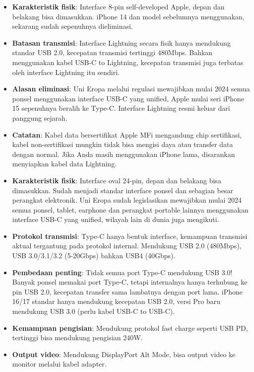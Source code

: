 
\begin{itemize}
  \item \textbf{Karakteristik fisik}: Interface 8-pin self-developed Apple, depan dan belakang bisa dimasukkan. iPhone 14 dan model sebelumnya menggunakan, sekarang sudah sepenuhnya dieliminasi.
  \item \textbf{Batasan transmisi}: Interface Lightning secara fisik hanya mendukung standar USB 2.0, kecepatan transmisi tertinggi 480Mbps. Bahkan menggunakan kabel USB-C to Lightning, kecepatan transmisi juga terbatas oleh interface Lightning itu sendiri.
  \item \textbf{Alasan eliminasi}: Uni Eropa melalui regulasi mewajibkan mulai 2024 semua ponsel menggunakan interface USB-C yang unified, Apple mulai seri iPhone 15 sepenuhnya beralih ke Type-C. Interface Lightning resmi keluar dari panggung sejarah.
  \item \textbf{Catatan}: Kabel data bersertifikat Apple MFi mengandung chip sertifikasi, kabel non-sertifikasi mungkin tidak bisa mengisi daya atau transfer data dengan normal. Jika Anda masih menggunakan iPhone lama, disarankan menyiapkan kabel data Lightning.
\end{itemize}


\begin{itemize}
  \item \textbf{Karakteristik fisik}: Interface oval 24-pin, depan dan belakang bisa dimasukkan. Sudah menjadi standar interface ponsel dan sebagian besar perangkat elektronik. Uni Eropa sudah legislasikan mewajibkan mulai 2024 semua ponsel, tablet, earphone dan perangkat portable lainnya menggunakan interface USB-C yang unified, wilayah lain di dunia juga mengikuti.
  \item \textbf{Protokol transmisi}: Type-C hanya bentuk interface, kemampuan transmisi aktual tergantung pada protokol internal. Mendukung USB 2.0 (480Mbps), USB 3.0/3.1/3.2 (5-20Gbps) bahkan USB4 (40Gbps).
  \item \textbf{Pembedaan penting}: Tidak semua port Type-C mendukung USB 3.0! Banyak ponsel memakai port Type-C, tetapi internalnya hanya terhubung ke pin USB 2.0, kecepatan transfer sama lambatnya dengan port lama. iPhone 16/17 standar hanya mendukung kecepatan USB 2.0, versi Pro baru mendukung USB 3.0 (perlu kabel USB-C to USB-C).
  \item \textbf{Kemampuan pengisian}: Mendukung protokol fast charge seperti USB PD, tertinggi bisa mendukung pengisian 240W.
  \item \textbf{Output video}: Mendukung DisplayPort Alt Mode, bisa output video ke monitor melalui kabel adapter.
\end{itemize}

